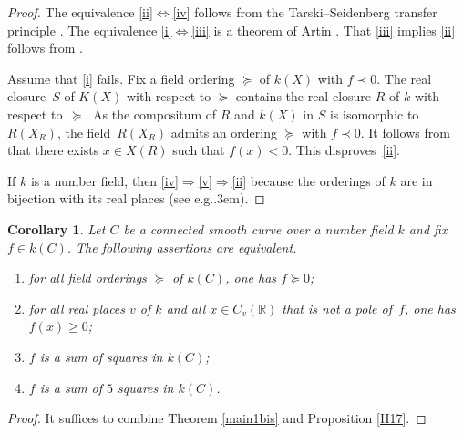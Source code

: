 \documentclass{amsart}
\newtheorem{cor}[thm]{Corollary}
\theoremstyle{definition}
\theoremstyle{remark}
\numberwithin{equation}{section}
\def\eg{e.g.\kern.3em}
\def\R{\mathbb R}
\begin{document}
\begin{proof}
The equivalence \ref{ii}$\Leftrightarrow$\ref{iv} follows from the Tarski--Seidenberg transfer principle \cite[Proposition 5.2.3]{BCR}.
The equivalence  \ref{i}$\Leftrightarrow$\ref{iii} is a theorem of Artin \cite[Satz 1]{Artin}.
That \ref{iii} implies \ref{ii} follows from \cite[Theorem~6.1.9~(i)$\Rightarrow$(iii)]{BCR}.

Assume that \ref{i} fails. Fix a field ordering $\succeq$ of $k(X)$ with $f\prec 0$. The real closure~$S$ of $K(X)$ with respect to $\succeq$ contains the real closure $R$ of $k$ with respect to~$\succeq$. As the compositum of $R$ and $k(X)$ in $S$ is isomorphic to $R(X_R)$, the field~$R(X_R)$ admits an ordering $\succeq$ with $f\prec 0$. It follows from \cite[Theorem~6.1.9~(iii)$\Rightarrow$(i)]{BCR} that there exists $x\in X(R)$ such that $f(x)<0$. This disproves~\ref{ii}.

If $k$ is a number field, then \ref{iv}$\Rightarrow$\ref{v}$\Rightarrow$\ref{ii} because the orderings of $k$ are in bijection with its real places (see \eg \cite[Satz 10]{AS}).
\end{proof}

\begin{cor}
\label{17}
Let $C$ be a connected smooth curve over a number field $k$ and fix~$f\in k(C)$. The following assertions are equivalent.
\begin{enumerate}[label=(\roman*)] 
\item
\label{a}
 for all field orderings $\succeq$ of $k(C)$, one has $f\succeq 0$;
\item
\label{b}
 for all real places $v$ of $k$ and all $x\in C_v(\R)$  that is not a pole of~$f$, one has~$f(x)\geq 0$;
\item 
\label{c}
$f$ is a sum of squares in $k(C)$;
\item 
\label{d}
$f$ is a sum of $5$ squares in $k(C)$.
\end{enumerate}
\end{cor}

\begin{proof}
It suffices to combine Theorem \ref{main1bis} and Proposition \ref{H17}.
\end{proof}




\end{document}
